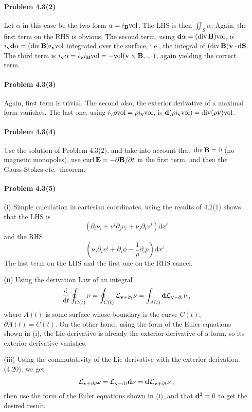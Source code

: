 \documentclass[a4paper,12pt]{article}
\def\d{\mathrm{d}}
\newcommand{\problem}[1]{\paragraph{Problem #1}}
\begin{document}

\problem{4.3(2)} Let $\alpha$ in this case be the two form $\alpha = i_{\bf B}{\rm vol}$. The LHS is then $\iint_S \alpha$. Again, the first term on the RHS is obvious. The second term, using ${\bf d}\alpha = (\mathop{\rm div}{\bf B}){\rm vol}$, is $i_{\bf v}{\bf d}\alpha = (\mathop{\rm div}{\bf B}) i_{\bf v}{\rm vol}$ integrated over the surface, i.e., the integral of $(\mathop{\rm div}{\bf B}) {\bf v}\cdot \d{\bf S}$. The third term is $i_{\bf v}\alpha = i_{\bf v}i_{\bf B}{\rm vol} = -{\rm vol}({\bf v}\times {\bf B}, \cdot, \cdot)$, again yielding the correct term.


\problem{4.3(3)} Again, first term is trivial. The second also, the exterior derivative of a maximal form vanishes. The last one, using $i_{\rm v}\rho {\rm vol} = \rho i_{\bf v}{\rm vol}$, is ${\bf d}(\rho i_{\bf v}{\rm vol}) = \mathop{\rm div}(\rho {\bf v}){\rm vol}$.


\problem{4.3(4)} Use the solution of Problem 4.3(2), and take into account that $\mathop{\rm div}{\bf B} = 0$ (no magnetic monopoles), use $\mathop{\rm curl}{\bf E} = -\partial {\bf B}/\partial t$ in the first term, and then
the Gauss-Stokes-etc.\ theorem.


\problem{4.3(5)} (i) Simple calculation in cartesian coordinates, using the results of 4.2(1) shows that the LHS is
\[
 (\partial_t \nu_i + v^j \partial_j \nu_i + \nu_j \partial_i v^j)\d x^i
\]
and the RHS
\[
 \left(\nu_j \partial_i v^j + \partial_i \phi -\frac{1}{\rho}\partial_i p\right)\d x^i\,.
\]
The last term on the LHS and the first one on the RHS cancel.

(ii) Using the derivation Law of an integral
\[
 \frac{\d}{\d t}\oint_{C(t)} \nu = \oint_{C(t)} \mathcal{L}_{{\bf v}+\partial_t}\nu = \int_{A(t)} {\bf d} \mathcal{L}_{{\bf v}+\partial_t}\nu\,,
\]
where $A(t)$ is some surface whose boundary is the curve $C(t)$, $\partial A(t)=C(t)$. On the other hand, using the form of the Euler equations shown in (i), the Lie-derivative is already the exterior derivative of a form, so its exterior derivative vanishes.

(iii) Using the commutativity of the Lie-derivative with the exterior derivation, (4.20), we get
\[
 \mathcal{L}_{{\bf v}+\partial t}\omega = \mathcal{L}_{{\bf v}+\partial t}{\bf d} \nu = {\bf d}\mathcal{L}_{{\bf v}+\partial t} \nu\,,
\]
then use the form of the Euler equations shown in (i), and that ${\bf d}^2=0$ to get the desired result.
\end{document}

